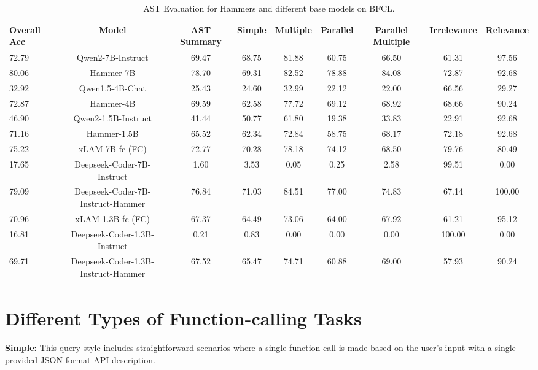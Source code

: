 \documentclass{article}
\begin{document}
\begin{table}[ht]
\caption{AST Evaluation for Hammers and different base models on BFCL.}
\tiny
\begin{tabular}{lcccccccc}
\toprule
Overall Acc & Model & AST Summary & Simple & Multiple & Parallel & Parallel Multiple & Irrelevance & Relevance \\
\midrule
72.79 & Qwen2-7B-Instruct & 69.47 & 68.75 & 81.88        & 60.75 & 66.50 & 61.31 & 97.56 \\
\rowcolor[HTML]{EFEFEF} 
80.06 & Hammer-7B & 78.70 & 69.31 & 82.52 & 78.88 & 84.08 & 72.87 & 92.68 \\
32.92 & Qwen1.5-4B-Chat & 25.43 & 24.60 & 32.99 & 22.12 & 22.00 & 66.56 & 29.27 \\
\rowcolor[HTML]{EFEFEF} 72.87 & Hammer-4B & 69.59 & 62.58 & 77.72 & 69.12 & 68.92 & 68.66 & 90.24 \\
46.90 & Qwen2-1.5B-Instruct & 41.44 & 50.77 & 61.80 & 19.38 & 33.83 & 22.91 & 92.68 \\
\rowcolor[HTML]{EFEFEF} 71.16 & Hammer-1.5B & 65.52 & 62.34 & 72.84 & 58.75 & 68.17 & 72.18 & 92.68 \\
\midrule
75.22 & xLAM-7B-fc (FC) & 72.77 & 70.28 & 78.18 & 74.12 & 68.50 & 79.76 & 80.49 \\
17.65 & Deepseek-Coder-7B-Instruct & 1.60 & 3.53 & 0.05 & 0.25 & 2.58 & 99.51 & 0.00 \\
\rowcolor[HTML]{EFEFEF} 79.09 & Deepseek-Coder-7B-Instruct-Hammer & 76.84 & 71.03 & 84.51 & 77.00 & 74.83 & 67.14 & 100.00 \\
70.96 & xLAM-1.3B-fc (FC) & 67.37 & 64.49 & 73.06 & 64.00 & 67.92 & 61.21 & 95.12 \\
16.81 & Deepseek-Coder-1.3B-Instruct & 0.21 & 0.83 & 0.00 & 0.00 & 0.00 & 100.00 & 0.00 \\
\rowcolor[HTML]{EFEFEF} 69.71 & Deepseek-Coder-1.3B-Instruct-Hammer & 67.52 & 65.47 & 74.71 & 60.88 & 69.00 & 57.93 & 90.24 \\
\bottomrule
\end{tabular}
\end{table}


\section{Different Types of Function-calling Tasks}
\label{apx:func-type}

\textbf{Simple:} This query style includes straightforward scenarios where a single function call is made based on the user’s input with a single provided JSON format API description.
\end{document}
